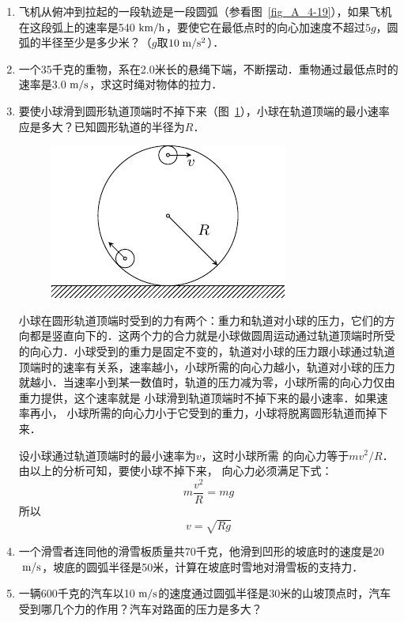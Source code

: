 \begin{enumerate}
\item  飞机从俯冲到拉起的一段轨迹是一段圆弧（参看图~\ref{fig_A_4-19}），如果飞机在这段弧上的速率是540$\;\text{km}/\text{h}$，要使它在最低点时的向心加速度不超过$5g$，圆弧的半径至少是多少米？（$g$取$10\;\text{m}/\text{s}^2$）．
\item  一个35千克的重物，系在2.0米长的悬绳下端，不断摆动．重物通过最低点时的速率是3.0$\;\text{m}/\text{s}$，求这时绳对物体的拉力．
\item  要使小球滑到圆形轨道顶端时不掉下来（图~\ref{fig_A_4-33}），小球在轨道顶端的最小速率应是多大？已知圆形轨道的半径为$R$．
\begin{figure}[htbp]
    \centering
    \includegraphics{fig/A/4-33.pdf}
    \caption{}\label{fig_A_4-33}
\end{figure}

\begin{solution}
小球在圆形轨道顶端时受到的力有两个：重力和轨道对小球的压力，它们的方向都是竖直向下的．这两个力的合力就是小球做圆周运动通过轨道顶端时所受的向心力．小球受到的重力是固定不变的，轨道对小球的压力跟小球通过轨道顶端时的速率有关系，速率越小，小球所需的向心力越小，轨道对小球的压力就越小．当速率小到某一数值时，轨道的压力减为零，小球所需的向心力仅由重力提供，这个速率就是
小球滑到轨道顶端时不掉下来的最小速率．如果速率再小，
小球所需的向心力小于它受到的重力，小球将脱离圆形轨道而掉下来．

设小球通过轨道顶端时的最小速率为$v$，这时小球所需
的向心力等于$mv^2/R$．
由以上的分析可知，要使小球不掉下来，
向心力必须满足下式：\[m\frac{v^2}{R}=mg \]
所以\[v=\sqrt{Rg} \]
\end{solution}

\item  一个滑雪者连同他的滑雪板质量共70千克，他滑到凹形的坡底时的速度是20$\;\text{m}/\text{s}$，坡底的圆弧半径是50米，计算在坡底时雪地对滑雪板的支持力．
\item  一辆600千克的汽车以10$\;\text{m}/\text{s}$的速度通过圆弧半径是30米的山坡顶点时，汽车受到哪几个力的作用？汽车对路面的压力是多大？

\end{enumerate}


















